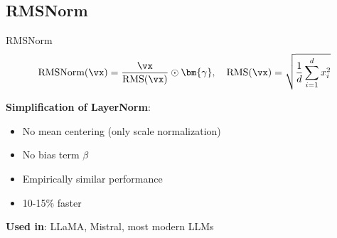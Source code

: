 \subsection{RMSNorm}

\begin{mathresult}{RMSNorm}
\begin{equation}
\text{RMSNorm}(\vx) = \frac{\vx}{\text{RMS}(\vx)} \odot \bm{\gamma}, \quad \text{RMS}(\vx) = \sqrt{\frac{1}{d}\sum_{i=1}^d x_i^2}
\end{equation}
\end{mathresult}

\textbf{Simplification of LayerNorm}:
\begin{itemize}
    \item No mean centering (only scale normalization)
    \item No bias term $\beta$
    \item Empirically similar performance
    \item 10-15\% faster
\end{itemize}

\textbf{Used in}: LLaMA, Mistral, most modern LLMs


